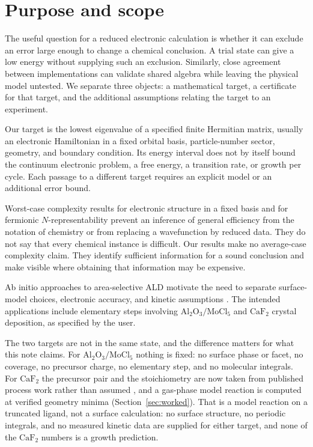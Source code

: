 \documentclass[11pt,a4paper]{article}
\theoremstyle{plain}
\theoremstyle{definition}
\theoremstyle{remark}
\begin{document}
\section{Purpose and scope}
\label{sec:intro}
The useful question for a reduced electronic calculation is whether it can
exclude an error large enough to change a chemical conclusion. A trial state
can give a low energy without supplying such an exclusion. Similarly, close
agreement between implementations can validate shared algebra while leaving
the physical model untested. We separate three objects: a mathematical target,
a certificate for that target, and the additional assumptions relating the
target to an experiment.

Our target is the lowest eigenvalue of a specified finite Hermitian matrix,
usually an electronic Hamiltonian in a fixed orbital basis, particle-number
sector, geometry, and boundary condition. Its energy interval does not by
itself bound the continuum electronic problem, a free energy, a transition
rate, or growth per cycle. Each passage to a different target requires an
explicit model or an additional error bound.

Worst-case complexity results for electronic structure in a fixed basis
\citep{OGorman2022} and for fermionic $N$-representability \citep{Liu2007}
prevent an inference of general efficiency from the notation of chemistry or
from replacing a wavefunction by reduced data. They do not say that every
chemical instance is difficult. Our results make no average-case complexity
claim. They identify sufficient information for a sound conclusion and make
visible where obtaining that information may be expensive.

Ab initio approaches to area-selective ALD motivate the need to separate
surface-model choices, electronic accuracy, and kinetic assumptions
\citep{Pieck2025}. The intended applications include elementary steps involving
$\mathrm{Al_2O_3}/\mathrm{MoCl_5}$ and $\mathrm{CaF_2}$ crystal deposition, as
specified by the user.

The two targets are not in the same state, and the difference matters for what
this note claims. For $\mathrm{Al_2O_3}/\mathrm{MoCl_5}$ nothing is fixed: no
surface phase or facet, no coverage, no precursor charge, no elementary step, and
no molecular integrals. For $\mathrm{CaF_2}$ the precursor pair and the
stoichiometry are now taken from published process work rather than assumed
\citep{Hennessy2023}, and a gas-phase model reaction is computed at verified
geometry minima (Section~\ref{sec:worked}). That is a model reaction on a
truncated ligand, not a surface calculation: no surface structure, no periodic
integrals, and no measured kinetic data are supplied for either target, and none
of the $\mathrm{CaF_2}$ numbers is a growth prediction.
\end{document}
